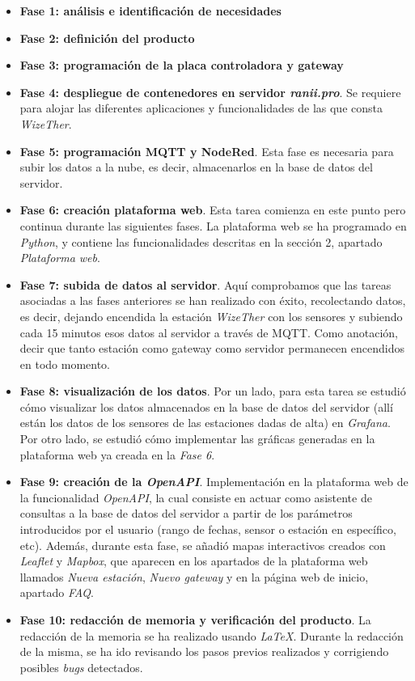 \documentclass[12pt]{article}
\begin{document}
\begin{itemize}
	\item \textbf{Fase 1: análisis e identificación de necesidades}
	\item \textbf{Fase 2: definición del producto}
	\item \textbf{Fase 3: programación de la placa controladora y gateway}
	\item \textbf{Fase 4: despliegue de contenedores en servidor \textit{ranii.pro}}. Se requiere para alojar las diferentes aplicaciones y funcionalidades de las que consta \textit{WizeTher}.
	\item  \textbf{Fase 5: programación MQTT y NodeRed}. Esta fase es necesaria para subir los datos a la nube, es decir, almacenarlos en la base de datos del servidor.
	\item \textbf{Fase 6: creación plataforma web}. Esta tarea comienza en este punto pero continua durante las siguientes fases. La plataforma web se ha programado en \textit{Python}, y contiene las funcionalidades descritas en la sección 2, apartado \textit{Plataforma web}.
	\item \textbf{Fase 7: subida de datos al servidor}. Aquí comprobamos que las tareas asociadas a las fases anteriores se han realizado con éxito, recolectando datos, es decir, dejando encendida la estación \textit{WizeTher} con los sensores y subiendo cada 15 minutos esos datos al servidor a través de MQTT. Como anotación, decir que tanto estación como gateway como servidor permanecen encendidos en todo momento.
	\item \textbf{Fase 8: visualización de los datos}. Por un lado, para esta tarea se estudió cómo visualizar los datos almacenados en la base de datos del servidor (allí están los datos de los sensores de las estaciones dadas de alta) en \textit{Grafana}. Por otro lado, se estudió cómo implementar las gráficas generadas en la plataforma web ya creada en la \textit{Fase 6}.
	\item \textbf{Fase 9: creación de la \textit{OpenAPI}}. Implementación en la plataforma web de la funcionalidad \textit{OpenAPI}, la cual consiste en actuar como asistente de consultas a la base de datos del servidor a partir de los parámetros introducidos por el usuario (rango de fechas, sensor o estación en específico, etc). Además, durante esta fase, se añadió mapas interactivos creados con \textit{Leaflet} y \textit{Mapbox}, que aparecen en los apartados de la plataforma web llamados \textit{Nueva estación}, \textit{Nuevo gateway} y en la página web de inicio, apartado \textit{FAQ}.
	\item \textbf{Fase 10: redacción de memoria y verificación del producto}. La redacción de la memoria se ha realizado usando \textit{LaTeX}. Durante la redacción de la misma, se ha ido revisando los pasos previos realizados y corrigiendo posibles \textit{bugs} detectados.
\end{itemize}
\end{document}
